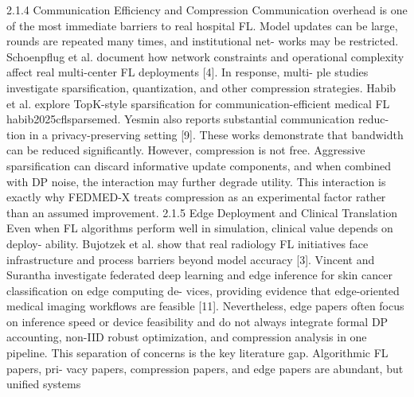2.1.4
Communication Efficiency and Compression
Communication overhead is one of the most immediate barriers to real hospital FL.
Model updates can be large, rounds are repeated many times, and institutional net- works may be restricted. Schoenpflug et al. document how network constraints and operational complexity affect real multi-center FL deployments [4]. In response, multi- ple studies investigate sparsification, quantization, and other compression strategies.
Habib et al. explore TopK-style sparsification for communication-efficient medical
FL habib2025cflsparsemed. Yesmin also reports substantial communication reduc- tion in a privacy-preserving setting [9]. These works demonstrate that bandwidth can be reduced significantly. However, compression is not free. Aggressive sparsification can discard informative update components, and when combined with DP noise, the interaction may further degrade utility. This interaction is exactly why FEDMED-X treats compression as an experimental factor rather than an assumed improvement.
2.1.5
Edge Deployment and Clinical Translation
Even when FL algorithms perform well in simulation, clinical value depends on deploy- ability. Bujotzek et al. show that real radiology FL initiatives face infrastructure and process barriers beyond model accuracy [3]. Vincent and Surantha investigate federated deep learning and edge inference for skin cancer classification on edge computing de- vices, providing evidence that edge-oriented medical imaging workflows are feasible [11].
Nevertheless, edge papers often focus on inference speed or device feasibility and do not always integrate formal DP accounting, non-IID robust optimization, and compression analysis in one pipeline.
This separation of concerns is the key literature gap. Algorithmic FL papers, pri- vacy papers, compression papers, and edge papers are abundant, but unified systems

